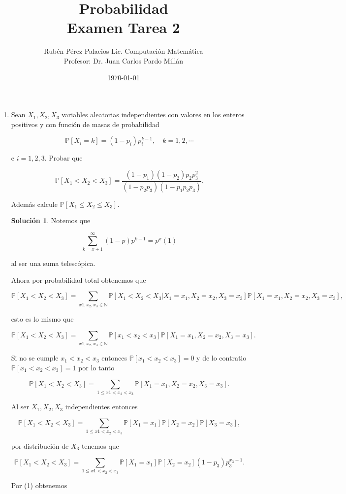 \documentclass[letterpaper]{article}
\title{Probabilidad \\ Examen Tarea 2}
\author{Rubén Pérez Palacios Lic. Computación Matemática\\Profesor: Dr. Juan Carlos Pardo Millán}
\date{\today}
\theoremstyle{definition}
\theoremstyle{lemathm}
\theoremstyle{lemathm}
\newtheorem{sol}{Solución}
\theoremstyle{lemathm}
\theoremstyle{lemademthm}
\newcommand{\pars}[1]{\left( #1 \right) }
\newcommand{\bracs}[1]{\left[ #1 \right] }
\newcommand{\NN}{\mathbb{N}}
\newcommand{\PP}{\mathbb{P}}
\newcommand{\1}{\mathbbm{1}}
\begin{document}
	\maketitle

	\begin{enumerate}
		\item Sean $X_1, X_2, X_3$ variables aleatorias independientes con valores en los enteros positivos y con función de masas de probabilidad
		
		\[\PP\bracs{X_i = k} = \pars{1-p_i}p_i^{k-1}, \quad k = 1,2,\cdots\]
		
		e $i=1,2,3$. Probar que
		
		\[\PP\bracs{X_1 < X_2 < X_3} = \frac{\pars{1-p_1}\pars{1-p_2}p_2p_3^2}{\pars{1-p_2p_3}\pars{1-p_1p_2p_3}}.\]

		Además calcule $\PP\bracs{X_1 \leq X_2 \leq X_3}$.
		
		\begin{sol}
			Notemos que

			\[\sum_{k=x+1}^{\infty} \pars{1-p}p^{k-1} = p^x(1)\]

			al ser una suma telescópica.

			Ahora por probabilidad total obtenemos que

			\[\PP\bracs{X_1 < X_2 < X_3} = \sum_{x1,x_2,x_3\in\NN} \PP\bracs{X_1 < X_2 < X_3|X_1 = x_1, X_2 = x_2, X_3 = x_3}\PP\bracs{X_1 = x_1, X_2 = x_2, X_3 = x_3},\]

			esto es lo mismo que

			\[\PP\bracs{X_1 < X_2 < X_3} = \sum_{x1,x_2,x_3\in\NN} \PP\bracs{x_1 < x_2 < x_3}\PP\bracs{X_1 = x_1, X_2 = x_2, X_3 = x_3}.\]

			Si no se cumple $x_1<x_2<x_3$ entonces $\PP\bracs{x_1 < x_2 < x_3} = 0$ y de lo contratio $\PP\bracs{x_1 < x_2 < x_3}=1$ por lo tanto

			\[\PP\bracs{X_1 < X_2 < X_3} = \sum_{1\leq x1 < x_2 < x_3} \PP\bracs{X_1 = x_1, X_2 = x_2, X_3 = x_3}.\]

			Al ser $X_1,X_2,X_3$ independientes entonces

			\[\PP\bracs{X_1 < X_2 < X_3} = \sum_{1\leq x1 < x_2 < x_3} \PP\bracs{X_1 = x_1}\PP\bracs{X_2 = x_2}\PP\bracs{X_3 = x_3},\]

			por distribución de $X_3$ tenemos que

			\[\PP\bracs{X_1 < X_2 < X_3} = \sum_{1 \leq x1 < x_2 < x_3} \PP\bracs{X_1 = x_1}\PP\bracs{X_2 = x_2}\pars{1-p_3}p_3^{x_3-1}.\]

			Por (1) obtenemos


\end{sol}
\end{enumerate}
\end{document}
